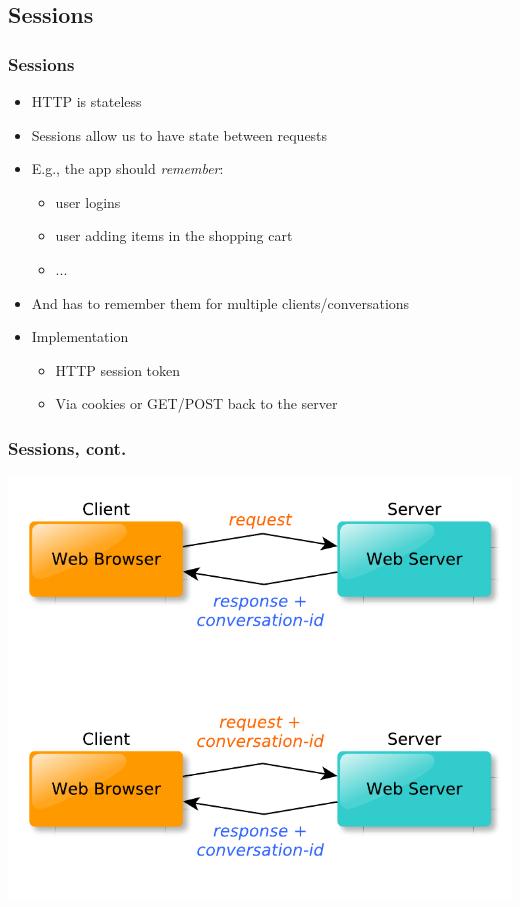 \documentclass{beamer}
\begin{document}
\subsection{Sessions} 
\begin{frame}\frametitle{Sessions}
 
  \begin{itemize}
  
    \item HTTP is stateless
    \item Sessions allow us to have state between requests
    \item E.g., the app should \textit{remember}:
    \begin{itemize}
      \item user logins
      \item user adding items in the shopping cart
      \item ...
    \end{itemize}

    \item And has to remember them for multiple clients/conversations
    
    \item Implementation
    \begin{itemize}
      \item HTTP session token
      \item Via cookies or GET/POST back to the server
    \end{itemize}

  \end{itemize}

\end{frame}




\begin{frame}\frametitle{Sessions, cont.}
 
  \begin{center}
    \includegraphics[scale=0.5]{diagrams/sessions.pdf}  
  \end{center}

\end{frame}
\end{document}
